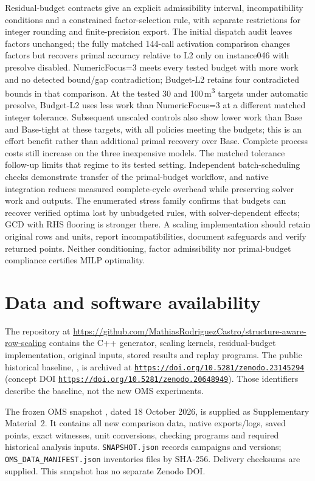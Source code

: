 \documentclass[11pt]{article}
\newcommand{\doi}[1]{\href{https://doi.org/#1}{\nolinkurl{https://doi.org/#1}}}
\theoremstyle{definition}
\theoremstyle{remark}
\begin{document}
Residual-budget contracts give an explicit admissibility interval, incompatibility conditions
and a constrained factor-selection rule, with separate restrictions for integer rounding
and finite-precision export. The initial dispatch audit leaves factors unchanged;
the fully matched 144-call activation comparison changes factors but recovers
primal accuracy relative to L2 only on instance046 with presolve disabled.
NumericFocus=3 meets every tested budget with more work and no detected bound/gap
contradiction; Budget-L2 retains four contradicted bounds in that comparison.
At the tested 30 and 100\,m\textsuperscript{3} targets under automatic presolve,
Budget-L2 uses less work than NumericFocus=3 at a different matched integer
tolerance. Subsequent unscaled controls also show lower work than Base and
Base-tight at these targets, with all policies meeting the budgets; this is
an effort benefit rather than additional primal recovery over Base. Complete
process costs still increase on the three inexpensive models.
The matched tolerance follow-up limits that regime to its tested setting.
Independent batch-scheduling checks demonstrate transfer of the primal-budget
workflow, and native integration reduces measured complete-cycle overhead while
preserving solver work and outputs.
The enumerated stress family confirms that budgets can recover verified optima lost
by unbudgeted rules, with solver-dependent effects; GCD with RHS flooring is stronger
there. A scaling implementation should retain original rows and units, report
incompatibilities, document safeguards and verify returned points. Neither conditioning,
factor admissibility nor primal-budget compliance certifies MILP optimality.

\section*{Data and software availability}
The repository at \url{https://github.com/MathiasRodriguezCastro/structure-aware-row-scaling}
contains the C++ generator, scaling kernels, residual-budget implementation,
original inputs, stored results and replay programs. The public historical baseline,
, is archived at \doi{10.5281/zenodo.23145294}
(concept DOI \doi{10.5281/zenodo.20648949}). Those identifiers describe the baseline,
not the new OMS experiments.

The frozen OMS snapshot , dated 18 October 2026,
is supplied as Supplementary Material~2. It contains all new comparison data,
native exports/logs, saved points, exact witnesses, unit conversions, checking
programs and required historical analysis inputs. \texttt{SNAPSHOT.json} records
campaigns and versions; \texttt{OMS\_DATA\_MANIFEST.json} inventories files by
SHA-256. Delivery checksums are supplied. This snapshot has no separate Zenodo DOI.
\end{document}
